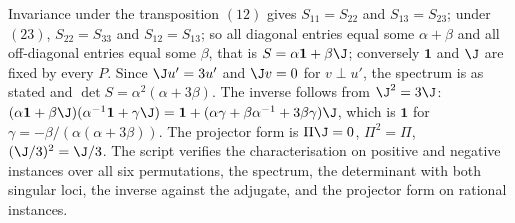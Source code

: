 Invariance under the transposition $(12)$ gives $S_{11} = S_{22}$ and $S_{13} = S_{23}$; under $(23)$, $S_{22} = S_{33}$ and $S_{12} = S_{13}$; so all diagonal entries equal some $\alpha + \beta$ and all off-diagonal entries equal some $\beta$, that is $S = \alpha\mathbf{1} + \beta\J$; conversely $\mathbf{1}$ and $\J$ are fixed by every $P$. Since $\J u' = 3u'$ and $\J v = 0$ for $v \perp u'$, the spectrum is as stated and $\det S = \alpha^{2}(\alpha + 3\beta)$. The inverse follows from $\J^{2} = 3\J$: $(\alpha\mathbf{1} + \beta\J)(\alpha^{-1}\mathbf{1} + \gamma\J) = \mathbf{1} + (\alpha\gamma + \beta\alpha^{-1} + 3\beta\gamma)\J$, which is $\mathbf{1}$ for $\gamma = -\beta/(\alpha(\alpha + 3\beta))$. The projector form is $\Pi\J = 0$, $\Pi^{2} = \Pi$, $(\J/3)^{2} = \J/3$. The script verifies the characterisation on positive and negative instances over all six permutations, the spectrum, the determinant with both singular loci, the inverse against the adjugate, and the projector form on rational instances.
